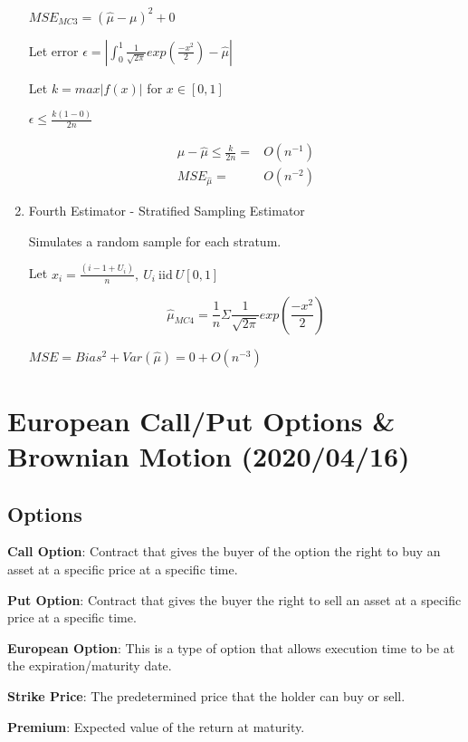 \documentclass[11pt]{article}
\begin{document}
\begin{enumerate}
\(MSE_{MC3} = (\hat \mu - \mu)^2 + 0\)

Let error \(\epsilon = |\int_0^1 \frac{1}{\sqrt{2 \pi}} exp(\frac{-x^2}{2}) - \hat \mu|\)

Let \(k = max |f(x)|\) for \(x \in [0, 1]\)

\(\epsilon \leq \frac{k(1 - 0)}{2n}\)

\begin{equation}
\begin{split}
\mu - \hat \mu \leq \frac{k}{2n} = & O(n^{-1})\\
MSE_{\hat \mu} = & O(n^{-2})
\end{split}
\end{equation}

\item Fourth Estimator - Stratified Sampling Estimator
\label{sec:org52b85d9}

Simulates a random sample for each stratum.

Let \(x_i = \frac{(i - 1 + U_i)}{n}, \ U_i \ \text{iid} \ U[0,1]\)

$$
\hat \mu_{MC4} = \frac{1}{n} \Sigma \frac{1}{\sqrt{2 \pi}} exp(\frac{-x^2}{2})
$$

\(MSE = Bias^2 + Var(\hat \mu) = 0 + O(n^{-3})\)
\end{enumerate}

\section{European Call/Put Options \& Brownian Motion (2020/04/16)}
\label{sec:org9a20759}
\subsection{Options}
\label{sec:orgdbaa811}

\textbf{Call Option}: Contract that gives the buyer of the option the right to buy an
 asset at a specific price at a specific time.

\textbf{Put Option}: Contract that gives the buyer the right to sell an asset at a
 specific price at a specific time.

\textbf{European Option}: This is a type of option that allows execution time to be at
 the expiration/maturity date.

\textbf{Strike Price}: The predetermined price that the holder can buy or sell.

\textbf{Premium}: Expected value of the return at maturity.
\end{document}
